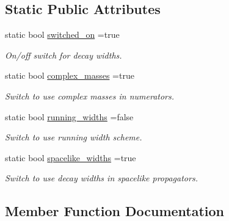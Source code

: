 \subsection*{Static Public Attributes}
\begin{DoxyCompactItemize}
\item 
\hypertarget{a00598_a69bd63c87b6015833e28cde38f10e128}{}static bool \hyperlink{a00598_a69bd63c87b6015833e28cde38f10e128}{switched\+\_\+on} =true\label{a00598_a69bd63c87b6015833e28cde38f10e128}

\begin{DoxyCompactList}\small\item\em On/off switch for decay widths. \end{DoxyCompactList}\item 
\hypertarget{a00598_a2ee4ca7f906d68bfe1d1e70b45be5617}{}static bool \hyperlink{a00598_a2ee4ca7f906d68bfe1d1e70b45be5617}{complex\+\_\+masses} =true\label{a00598_a2ee4ca7f906d68bfe1d1e70b45be5617}

\begin{DoxyCompactList}\small\item\em Switch to use complex masses in numerators. \end{DoxyCompactList}\item 
\hypertarget{a00598_a5cd7dd85a52f0a435d82e0ffdf8d8442}{}static bool \hyperlink{a00598_a5cd7dd85a52f0a435d82e0ffdf8d8442}{running\+\_\+widths} =false\label{a00598_a5cd7dd85a52f0a435d82e0ffdf8d8442}

\begin{DoxyCompactList}\small\item\em Switch to use running width scheme. \end{DoxyCompactList}\item 
\hypertarget{a00598_ade2afe8bfe82478e458c4949597f9f1a}{}static bool \hyperlink{a00598_ade2afe8bfe82478e458c4949597f9f1a}{spacelike\+\_\+widths} =true\label{a00598_ade2afe8bfe82478e458c4949597f9f1a}

\begin{DoxyCompactList}\small\item\em Switch to use decay widths in spacelike propagators. \end{DoxyCompactList}\end{DoxyCompactItemize}


\subsection{Member Function Documentation}
\hypertarget{a00598_ab66801bcee8fd7a0a7b0b31b8d3b78a9}{}
